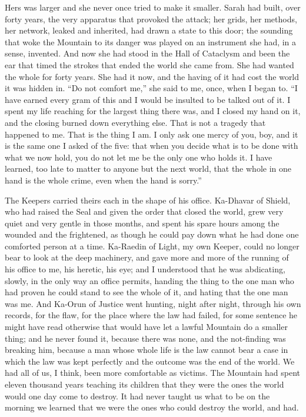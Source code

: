 Hers was larger and she never once tried to make it smaller. Sarah had built, over forty years, the very apparatus that provoked the attack; her grids, her methods, her network, leaked and inherited, had drawn a state to this door; the sounding that woke the Mountain to its danger was played on an instrument she had, in a sense, invented. And now she had stood in the Hall of Cataclysm and been the ear that timed the strokes that ended the world she came from. She had wanted the whole for forty years. She had it now, and the having of it had cost the world it was hidden in. ``Do not comfort me,'' she said to me, once, when I began to. ``I have earned every gram of this and I would be insulted to be talked out of it. I spent my life reaching for the largest thing there was, and I closed my hand on it, and the closing burned down everything else. That is not a tragedy that happened to me. That is the thing I am. I only ask one mercy of you, boy, and it is the same one I asked of the five: that when you decide what is to be done with what we now hold, you do not let me be the only one who holds it. I have learned, too late to matter to anyone but the next world, that the whole in one hand is the whole crime, even when the hand is sorry.''\par

The Keepers carried theirs each in the shape of his office. Ka-Dhavar of Shield, who had raised the Seal and given the order that closed the world, grew very quiet and very gentle in those months, and spent his spare hours among the wounded and the frightened, as though he could pay down what he had done one comforted person at a time. Ka-Raedin of Light, my own Keeper, could no longer bear to look at the deep machinery, and gave more and more of the running of his office to me, his heretic, his eye; and I understood that he was abdicating, slowly, in the only way an office permits, handing the thing to the one man who had proven he could stand to see the whole of it, and hating that the one man was me. And Ka-Orun of Justice went hunting, night after night, through his own records, for the flaw, for the place where the law had failed, for some sentence he might have read otherwise that would have let a lawful Mountain do a smaller thing; and he never found it, because there was none, and the not-finding was breaking him, because a man whose whole life is the law cannot bear a case in which the law was kept perfectly and the outcome was the end of the world. We had all of us, I think, been more comfortable as victims. The Mountain had spent eleven thousand years teaching its children that they were the ones the world would one day come to destroy. It had never taught us what to be on the morning we learned that we were the ones who could destroy the world, and had.\par

